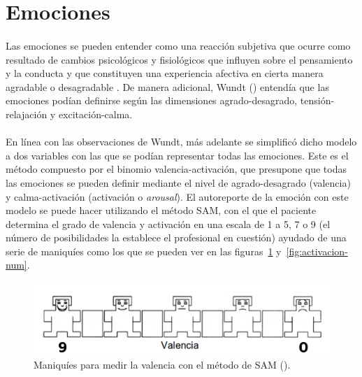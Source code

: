 \section{Emociones}
\label{cap1:sec:Emociones}

\paragraph{}
Las emociones se pueden entender como una reacción subjetiva que ocurre como resultado de cambios psicológicos y fisiológicos que influyen sobre el pensamiento y la conducta \citep{psicoemocional} y que constituyen una experiencia afectiva en cierta manera agradable o desagradable \citep{montanes2005psicologia}. De manera adicional, Wundt (\citeyear{wundt1896lectures}) entendía que las emociones podían definirse según las dimensiones agrado-desagrado, tensión-relajación y excitación-calma.

\paragraph{}
En línea con las observaciones de Wundt, más adelante se simplificó dicho modelo a dos variables con las que se podían representar todas las emociones. Este es el método compuesto por el binomio valencia-activación, que presupone que todas las emociones se pueden definir mediante el nivel de agrado-desagrado (valencia) y calma-activación (activación o \textit{arousal}). El autoreporte de la emoción con este modelo se puede hacer utilizando el método \ac{SAM}, con el que el paciente determina el grado de valencia y activación en una escala de 1 a 5, 7 o 9 (el número de posibilidades la establece el profesional en cuestión) ayudado de una serie de maniquíes como los que se pueden ver en las figuras~\ref{fig:valencia-num} y~\ref{fig:activacion-num}.

\begin{figure}[h]
    \centering
    \includegraphics[scale=0.75]{Imagenes/valencia-num}
    \caption[Maniquíes para medir la valencia con el método de SAM extraídos del texto de Hernández (\citeyear{hernandez2016clasificacion}).]{Maniquíes para medir la valencia con el método de SAM (\citep{hernandez2016clasificacion}).}
    \label{fig:valencia-num}
\end{figure}

